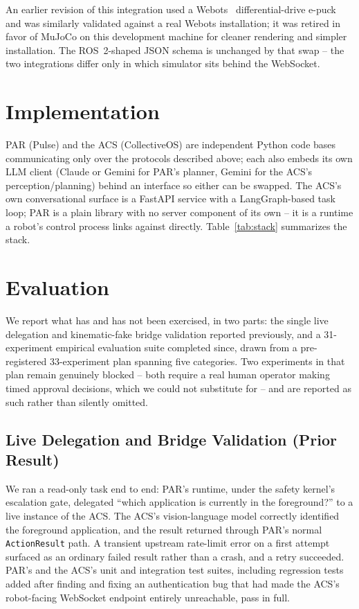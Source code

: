 \documentclass{article}
\begin{document}
An earlier revision of this integration used a Webots~\citep{michel2004webots} differential-drive e-puck and was similarly validated against a real Webots installation; it was retired in favor of MuJoCo on this development machine for cleaner rendering and simpler installation. The ROS~2-shaped JSON schema is unchanged by that swap -- the two integrations differ only in which simulator sits behind the WebSocket.


\section{Implementation}

PAR (Pulse) and the ACS (CollectiveOS) are independent Python code bases communicating only over the protocols described above; each also embeds its own LLM client (Claude or Gemini for PAR's planner, Gemini for the ACS's perception/planning) behind an interface so either can be swapped. The ACS's own conversational surface is a FastAPI service with a LangGraph-based task loop; PAR is a plain library with no server component of its own -- it is a runtime a robot's control process links against directly. Table~\ref{tab:stack} summarizes the stack.


\section{Evaluation}
\label{sec:evaluation}

We report what has and has not been exercised, in two parts: the single live delegation and kinematic-fake bridge validation reported previously, and a 31-experiment empirical evaluation suite completed since, drawn from a pre-registered 33-experiment plan spanning five categories. Two experiments in that plan remain genuinely blocked -- both require a real human operator making timed approval decisions, which we could not substitute for -- and are reported as such rather than silently omitted.

\subsection{Live Delegation and Bridge Validation (Prior Result)}
We ran a read-only task end to end: PAR's runtime, under the safety kernel's escalation gate, delegated ``which application is currently in the foreground?'' to a live instance of the ACS. The ACS's vision-language model correctly identified the foreground application, and the result returned through PAR's normal \texttt{ActionResult} path. A transient upstream rate-limit error on a first attempt surfaced as an ordinary failed result rather than a crash, and a retry succeeded. PAR's and the ACS's unit and integration test suites, including regression tests added after finding and fixing an authentication bug that had made the ACS's robot-facing WebSocket endpoint entirely unreachable, pass in full.
\end{document}
